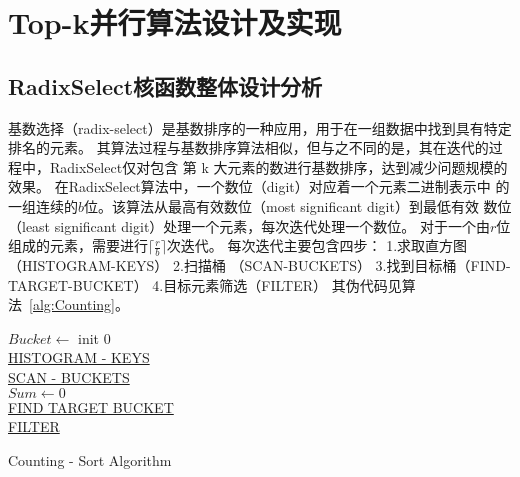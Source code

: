 \section{Top-k并行算法设计及实现}

\subsection{RadixSelect核函数整体设计分析}
基数选择（radix-select）是基数排序的一种应用，用于在一组数据中找到具有特定排名的元素。
其算法过程与基数排序算法相似，但与之不同的是，其在迭代的过程中，RadixSelect仅对包含
第 k 大元素的数进行基数排序，达到减少问题规模的效果。
在RadixSelect算法中，一个数位（digit）对应着一个元素二进制表示中
的一组连续的\(b\)位。该算法从最高有效数位（most significant digit）到最低有效
数位（least significant digit）处理一个元素，每次迭代处理一个数位。
对于一个由\(r\)位组成的元素，需要进行\(\lceil\frac{r}{b}\rceil\)次迭代。
每次迭代主要包含四步：
1.求取直方图（HISTOGRAM-KEYS） 
2.扫描桶 （SCAN-BUCKETS） 
3.找到目标桶（FIND-TARGET-BUCKET） 
4.目标元素筛选（FILTER）
其伪代码见算法~\ref{alg:Counting}。

\begin{algorithm}
    \SetAlgoLined
    $Bucket \leftarrow$ init $0$ \\ 
    \underline{HISTOGRAM - KEYS}\\
    \underline{SCAN - BUCKETS}\\
    $Sum \leftarrow 0$\\
    \underline{FIND TARGET BUCKET}\\
    \underline{FILTER}\\
    \caption{Counting - Sort Algorithm}
    \label{alg:Counting}
  \end{algorithm}
  

